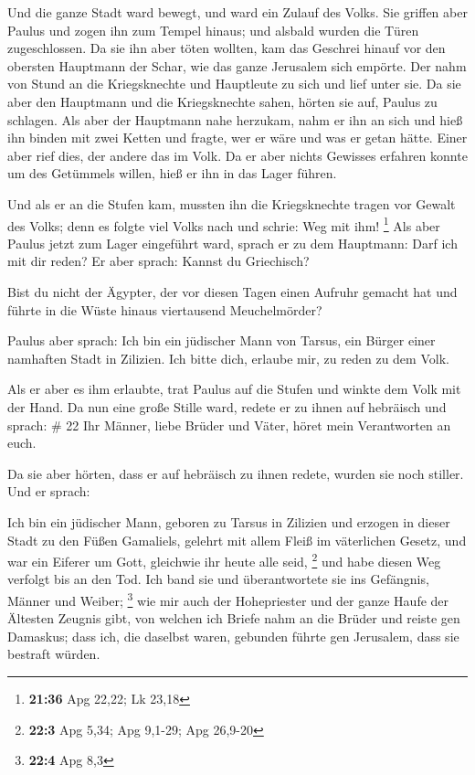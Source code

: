  Und die ganze Stadt ward bewegt, und ward ein Zulauf des
Volks. Sie griffen aber Paulus und zogen ihn zum Tempel hinaus; und
alsbald wurden die Türen zugeschlossen.  Da sie ihn aber
töten wollten, kam das Geschrei hinauf vor den obersten Hauptmann der
Schar, wie das ganze Jerusalem sich empörte.  Der nahm
von Stund an die Kriegsknechte und Hauptleute zu sich und lief unter
sie. Da sie aber den Hauptmann und die Kriegsknechte sahen, hörten sie
auf, Paulus zu schlagen.  Als aber der Hauptmann nahe
herzukam, nahm er ihn an sich und hieß ihn binden mit zwei Ketten und
fragte, wer er wäre und was er getan hätte.  Einer aber
rief dies, der andere das im Volk. Da er aber nichts Gewisses erfahren
konnte um des Getümmels willen, hieß er ihn in das Lager führen.

 Und als er an die Stufen kam, mussten ihn die
Kriegsknechte tragen vor Gewalt des Volks;  denn es
folgte viel Volks nach und schrie: Weg mit ihm! \footnote{\textbf{21:36}
  Apg 22,22; Lk 23,18}  Als aber Paulus jetzt zum Lager
eingeführt ward, sprach er zu dem Hauptmann: Darf ich mit dir reden? Er
aber sprach: Kannst du Griechisch?

 Bist du nicht der Ägypter, der vor diesen Tagen einen
Aufruhr gemacht hat und führte in die Wüste hinaus viertausend
Meuchelmörder?

 Paulus aber sprach: Ich bin ein jüdischer Mann von
Tarsus, ein Bürger einer namhaften Stadt in Zilizien. Ich bitte dich,
erlaube mir, zu reden zu dem Volk.

 Als er aber es ihm erlaubte, trat Paulus auf die Stufen
und winkte dem Volk mit der Hand. Da nun eine große Stille ward, redete
er zu ihnen auf hebräisch und sprach: \# 22  Ihr Männer,
liebe Brüder und Väter, höret mein Verantworten an euch.

 Da sie aber hörten, dass er auf hebräisch zu ihnen
redete, wurden sie noch stiller. Und er sprach:

 Ich bin ein jüdischer Mann, geboren zu Tarsus in Zilizien
und erzogen in dieser Stadt zu den Füßen Gamaliels, gelehrt mit allem
Fleiß im väterlichen Gesetz, und war ein Eiferer um Gott, gleichwie ihr
heute alle seid, \footnote{\textbf{22:3} Apg 5,34; Apg 9,1-29; Apg
  26,9-20}  und habe diesen Weg verfolgt bis an den Tod.
Ich band sie und überantwortete sie ins Gefängnis, Männer und Weiber;
\footnote{\textbf{22:4} Apg 8,3}  wie mir auch der
Hohepriester und der ganze Haufe der Ältesten Zeugnis gibt, von welchen
ich Briefe nahm an die Brüder und reiste gen Damaskus; dass ich, die
daselbst waren, gebunden führte gen Jerusalem, dass sie bestraft würden.


